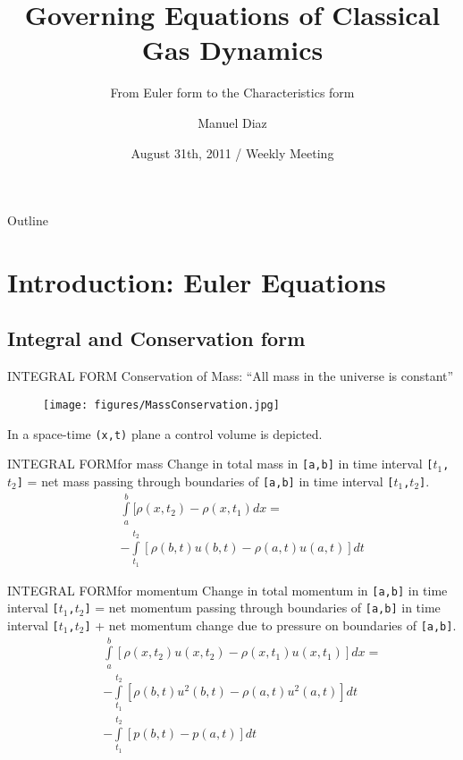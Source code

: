 \documentclass{beamer}
\title[Governing Equations] %
{Governing Equations of Classical Gas Dynamics}
\subtitle
{From Euler form to the Characteristics form} %
\author[Manuel Diaz] %
{Manuel Diaz\inst{1} }
\institute[National Taiwan University] %
{
  \inst{1}%
  National Taiwan University\\
  Institute of Applied Mechanics}
\date[August 31th, 2011] %
{August 31th, 2011 / Weekly Meeting}
\begin{document}
\begin{frame}
  \titlepage
\end{frame}

\begin{frame}{Outline}
  \tableofcontents
\end{frame}




\section{Introduction: Euler Equations}

\subsection[Integral and Conservation form]{Integral and Conservation form}

\begin{frame}{INTEGRAL FORM}
  Conservation of Mass: ``All mass in the universe is constant''
  \begin{figure}
    \texttt{[image: figures/MassConservation.jpg]}
  \end{figure}
    In a space-time \texttt{(x,t)} plane a control volume is depicted.
\end{frame}
 

\begin{frame}{INTEGRAL FORM}{for mass}
  Change in total mass in \texttt{[a,b]} in time interval \texttt{[$t_1$,$t_2$]} = net mass passing through boundaries of \texttt{[a,b]} in time interval \texttt{[$t_1$,$t_2$]}.
  \begin{eqnarray}\nonumber
    && \int\limits_a^b[\rho(x,t_2)-\rho(x,t_1)dx = \nonumber \\
    && -\int\limits_{t_1}^{t_2}[\rho(b,t)u(b,t)-\rho(a,t)u(a,t)]dt
  \end{eqnarray}
\end{frame}

\begin{frame}{INTEGRAL FORM}{for momentum}
  Change in total momentum in \texttt{[a,b]} in time interval \texttt{[$t_1$,$t_2$]} = net momentum passing through boundaries of \texttt{[a,b]} in time interval \texttt{[$t_1$,$t_2$]} + net momentum change due to pressure on boundaries of \texttt{[a,b]}.
  \begin{eqnarray}
    && \int\limits_a^b[\rho(x,t_2)u(x,t_2)-\rho(x,t_1)u(x,t_1)]dx = \nonumber \\
    && -\int\limits_{t_1}^{t_2}[\rho(b,t)u^2(b,t)-\rho(a,t)u^2(a,t)]dt \nonumber \\
    && -\int\limits_{t_1}^{t_2}[p(b,t)-p(a,t)]dt 
  \end{eqnarray}
\end{frame}
\end{document}
